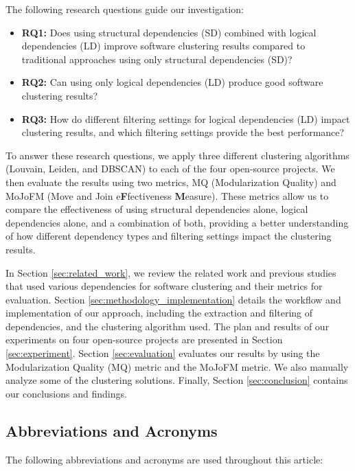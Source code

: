 \documentclass{ieeeaccess}
\begin{document}
The following research questions guide our investigation:

\begin{itemize}
    \item \textbf{RQ1:} Does using structural dependencies (SD) combined with logical dependencies (LD) improve software clustering results compared to traditional approaches using only structural dependencies (SD)?
    \item \textbf{RQ2:} Can using only logical dependencies (LD) produce good software clustering results?
    \item \textbf{RQ3:} How do different filtering settings for logical dependencies (LD) impact clustering results, and which filtering settings provide the best performance?
\end{itemize}

To answer these research questions, we apply three different clustering algorithms (Louvain, Leiden, and DBSCAN) to each of the four open-source projects. We then evaluate the results using two metrics, MQ (Modularization Quality)\cite{b10} and MoJoFM (Move and Join e\textbf{F}fectiveness \textbf{M}easure)\cite{mojofm}. These metrics allow us to compare the effectiveness of using structural dependencies alone, logical dependencies alone, and a combination of both, providing a better understanding of how different dependency types and filtering settings impact the clustering results.


In Section \ref{sec:related_work}, we review the related work and previous studies that used various dependencies for software clustering and their metrics for evaluation.
Section \ref{sec:methodology_implementation} details the workflow and implementation of our approach, including the extraction and filtering of dependencies, and the clustering algorithm used.
The plan and results of our experiments on four open-source projects are presented in Section \ref{sec:experiment}. Section \ref{sec:evaluation} evaluates our results by using the Modularization Quality (MQ) metric and the MoJoFM metric. We also manually analyze some of the clustering solutions.
Finally, Section \ref{sec:conclusion} contains our conclusions and findings.

\subsection{Abbreviations and Acronyms}

The following abbreviations and acronyms are used throughout this article:
\end{document}
